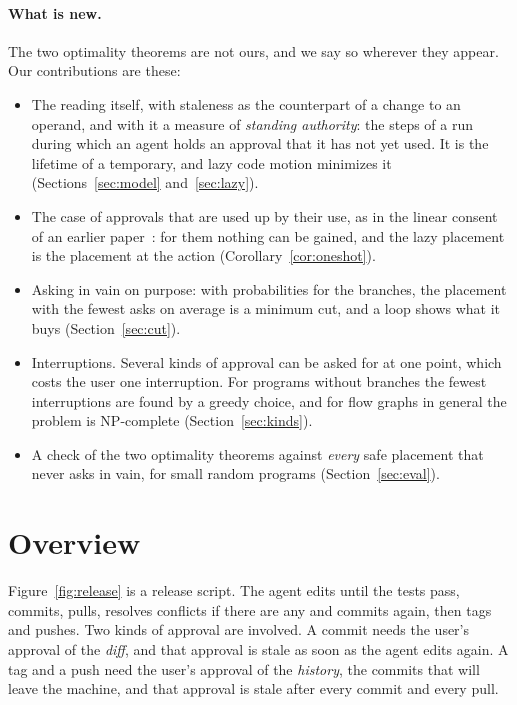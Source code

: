 \documentclass[acmsmall,nonacm,screen]{acmart}
\begin{document}
\paragraph{What is new.} The two optimality theorems are not ours, and we say so wherever
they appear. Our contributions are these:
\begin{itemize}
\item The reading itself, with staleness as the counterpart of a change to an operand, and
  with it a measure of \emph{standing authority}: the steps of a run during which an agent
  holds an approval that it has not yet used. It is the lifetime of a temporary, and lazy
  code motion minimizes it (Sections~\ref{sec:model} and~\ref{sec:lazy}).
\item The case of approvals that are used up by their use, as in the linear consent of an
  earlier paper~\cite{tpp4}: for them nothing can be gained, and the lazy placement is the
  placement at the action (Corollary~\ref{cor:oneshot}).
\item Asking in vain on purpose: with probabilities for the branches, the placement with
  the fewest asks on average is a minimum cut, and a loop shows what it buys
  (Section~\ref{sec:cut}).
\item Interruptions. Several kinds of approval can be asked for at one point, which costs
  the user one interruption. For programs without branches the fewest interruptions are
  found by a greedy choice, and for flow graphs in general the problem is NP-complete
  (Section~\ref{sec:kinds}).
\item A check of the two optimality theorems against \emph{every} safe placement that never
  asks in vain, for \exGraphs{} small random programs (Section~\ref{sec:eval}).
\end{itemize}

\section{Overview}
\label{sec:overview}

Figure~\ref{fig:release} is a release script. The agent edits until the tests pass,
commits, pulls, resolves conflicts if there are any and commits again, then tags and pushes.
Two kinds of approval are involved. A commit needs the user's approval of the \emph{diff},
and that approval is stale as soon as the agent edits again. A tag and a push need the
user's approval of the \emph{history}, the commits that will leave the machine, and that
approval is stale after every commit and every pull.
\end{document}
